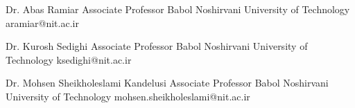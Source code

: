 
\vspace{5pt}

\begin{referees}\label{supervisor}
  {\label{recom:ramiar}
    Dr. Abas Ramiar
  }
  {Associate Professor}
  {Babol Noshirvani University of Technology}
  {aramiar@nit.ac.ir}
  {}

  {Dr. Kurosh Sedighi}
  {Associate Professor}
  {Babol Noshirvani University of Technology}
  {ksedighi@nit.ac.ir}
  {}

  {Dr. Mohsen Sheikholeslami Kandelusi}
  {Associate Professor}
  {Babol Noshirvani University of Technology}
  {mohsen.sheikholeslami@nit.ac.ir}
  {}
\end{referees}
